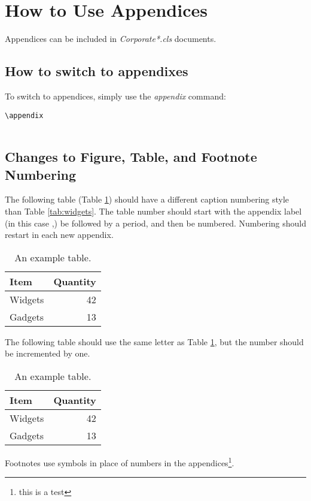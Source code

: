 \section{How to Use Appendices}
Appendices can be included in \emph{Corporate*.cls} documents. 

\subsection{How to switch to appendixes}
To switch to appendices, simply use the \emph{appendix} command:

\begin{lstlisting}
\appendix


\end{lstlisting}

\subsection{Changes to Figure, Table, and Footnote Numbering}
The following table (Table \ref{tab:AppAWidgets}) should have a different caption numbering style than Table \ref{tab:widgets}. The table number should start with the appendix label (in this case \thesection,) be followed by a period, and then be numbered. Numbering should restart in each new appendix.

\begin{table}[!h]
\centering
\caption{An example table.}\label{tab:AppAWidgets}
\begin{tabular}{lr}
Item & Quantity \\
\hline
Widgets & 42 \\
Gadgets & 13
\end{tabular}
\end{table}

The following table should use the same letter as Table \ref{tab:AppAWidgets}, but the number should be incremented by one.

\begin{table}[!h]
\centering
\caption{An example table.}\label{tab:AppAWidgetsTwo}
\begin{tabular}{lr}
Item & Quantity \\
\hline
Widgets & 42 \\
Gadgets & 13
\end{tabular}
\end{table}

Footnotes use symbols in place of numbers in the appendices\footnote{this is a test}.